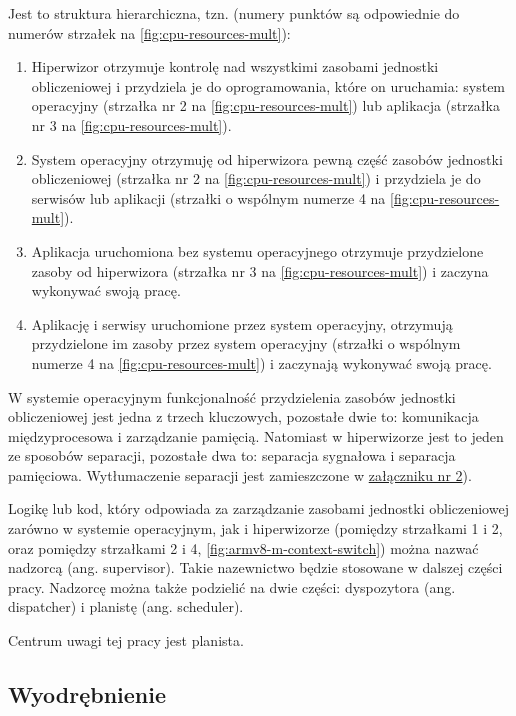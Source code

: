 \documentclass[../../main]{subfiles}
\begin{document}
Jest to struktura hierarchiczna, tzn. (numery punktów są odpowiednie do numerów strzałek na \cref{fig:cpu-resources-mult}):

\begin{enumerate}
    \item Hiperwizor otrzymuje kontrolę nad wszystkimi zasobami jednostki obliczeniowej i przydziela je do oprogramowania, które on uruchamia: system operacyjny (strzałka nr 2 na \cref{fig:cpu-resources-mult}) lub aplikacja (strzałka nr 3 na \cref{fig:cpu-resources-mult}).
    \item System operacyjny otrzymuję od hiperwizora pewną część zasobów jednostki obliczeniowej (strzałka nr 2 na \cref{fig:cpu-resources-mult}) i przydziela je do serwisów lub aplikacji (strzałki o wspólnym numerze 4 na \cref{fig:cpu-resources-mult}).
    \item Aplikacja uruchomiona bez systemu operacyjnego otrzymuje przydzielone zasoby od hiperwizora (strzałka nr 3 na \cref{fig:cpu-resources-mult}) i zaczyna wykonywać swoją pracę.
    \item Aplikację i serwisy uruchomione przez system operacyjny, otrzymują przydzielone im zasoby przez system operacyjny (strzałki o wspólnym numerze 4 na \cref{fig:cpu-resources-mult}) i zaczynają wykonywać swoją pracę.
\end{enumerate}

W systemie operacyjnym funkcjonalność przydzielenia zasobów jednostki obliczeniowej jest jedna z trzech kluczowych, pozostałe dwie to: komunikacja międzyprocesowa i zarządzanie pamięcią. Natomiast w hiperwizorze jest to jeden ze sposobów separacji, pozostałe dwa to: separacja sygnałowa i separacja pamięciowa. Wytłumaczenie separacji jest zamieszczone w \hyperref[sec:zalacznik-2]{załączniku nr 2}).

Logikę lub kod, który odpowiada za zarządzanie zasobami jednostki obliczeniowej zarówno w systemie operacyjnym, jak i hiperwizorze (pomiędzy strzałkami 1 i 2, oraz pomiędzy strzałkami 2 i 4, \cref{fig:armv8-m-context-switch}) można nazwać nadzorcą (ang. supervisor). Takie nazewnictwo będzie stosowane w dalszej części pracy. Nadzorcę można także podzielić na dwie części: dyspozytora (ang. dispatcher) i planistę (ang. scheduler).

Centrum uwagi tej pracy jest planista.

\subsection{Wyodrębnienie}
\end{document}
